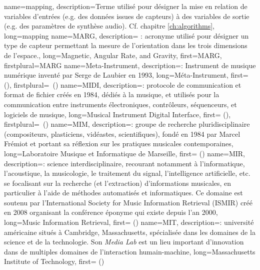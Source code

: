 {
    name={mapping},
    description={Terme utilisé pour désigner la mise en relation de variables d'entrées (e.g. des données issues de capteurs) à des variables de sortie (e.g. des paramètres de synthèse audio). Cf. chapitre \ref{ch:algorithms}},
    long={mapping}
}
{
    name={MARG},
    description={\textit{} : acronyme utilisé pour désigner un type de capteur permettant la mesure de l'orientation dans les trois dimensions de l'espace.},
    long={Magnetic, Angular Rate, and Gravity},
    first={MARG},
    firstplural={MARG}
}
{
    name={Meta-Instrument},
    description={\textit{}: Instrument de musique numérique inventé par Serge de Laubier en 1993},
    long={Méta-Instrument},
    first={ ()},
    firstplural={\glspluralsuffix\ (\glspluralsuffix)}
}
{
    name={MIDI},
    description={\textit{}: protocole de communication et format de fichier créés en 1984, dédiés à la musique, et utilisés pour la communication entre instruments électroniques, contrôleurs, séquenceurs, et logiciels de musique},
    long={Musical Instrument Digital Interface},
   	first={ ()},
    firstplural={\glspluralsuffix\ (\glspluralsuffix)}
}
{
    name={MIM},
    description={\textit{}: groupe de recherche pluridisciplinaire (compositeurs, plasticiens, vidéastes, scientifiques), fondé en 1984 par Marcel Frémiot et portant sa réflexion sur les pratiques musicales contemporaines},
    long={Laboratoire Musique et Informatique de Marseille},
    first={ ()}
}
{
    name={MIR},
    description={\textit{}: science interdisciplinaire, recourant notamment à l'informatique, l'acoustique, la musicologie, le traitement du signal, l'intelligence artificielle, etc. se focalisant sur la recherche (et l'extraction) d'informations musicales, en particulier à l'aide de méthodes automatisés et informatiques. Ce domaine est soutenu par l'International Society for Music Information Retrieval (ISMIR) créé en 2008 organisant la conférence éponyme qui existe depuis l'an 2000},
    long={Music Information Retrieval},
    first={ ()}
}
{
    name={MIT},
    description={\textit{}: université américaine situés à Cambridge, Massachusetts, spécialisée dans les domaines de la science et de la technologie. Son \textit{Media Lab} est un lieu important d'innovation dans de multiples domaines de l'interaction humain-machine},
    long={Massachusetts Institute of Technology},
    first={ ()}
}
